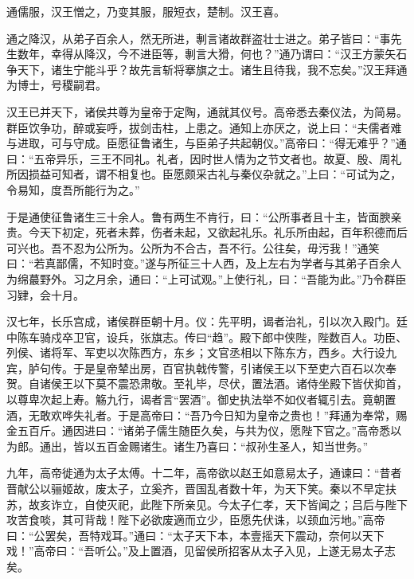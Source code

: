\documentclass[12pt,UTF8]{ctexbook}
\begin{document}
通儒服，汉王憎之，乃变其服，服短衣，楚制。汉王喜。



通之降汉，从弟子百余人，然无所进，剸言诸故群盗壮士进之。弟子皆曰：“事先生数年，幸得从降汉，今不进臣等，剸言大猾，何也？”通乃谓曰：“汉王方蒙矢石争天下，诸生宁能斗乎？故先言斩将搴旗之士。诸生且待我，我不忘矣。”汉王拜通为博士，号稷嗣君。



汉王已并天下，诸侯共尊为皇帝于定陶，通就其仪号。高帝悉去秦仪法，为简易。群臣饮争功，醉或妄呼，拔剑击柱，上患之。通知上亦厌之，说上曰：“夫儒者难与进取，可与守成。臣愿征鲁诸生，与臣弟子共起朝仪。”高帝曰：“得无难乎？”通曰：“五帝异乐，三王不同礼。礼者，因时世人情为之节文者也。故夏、殷、周礼所因损益可知者，谓不相复也。臣愿颇采古礼与秦仪杂就之。”上曰：“可试为之，令易知，度吾所能行为之。”



于是通使征鲁诸生三十余人。鲁有两生不肯行，曰：“公所事者且十主，皆面腴亲贵。今天下初定，死者未葬，伤者未起，又欲起礼乐。礼乐所由起，百年积德而后可兴也。吾不忍为公所为。公所为不合古，吾不行。公往矣，毋污我！”通笑曰：“若真鄙儒，不知时变。”遂与所征三十人西，及上左右为学者与其弟子百余人为绵蕞野外。习之月余，通曰：“上可试观。”上使行礼，曰：“吾能为此。”乃令群臣习肄，会十月。



汉七年，长乐宫成，诸侯群臣朝十月。仪：先平明，谒者治礼，引以次入殿门。廷中陈车骑戍卒卫官，设兵，张旗志。传曰“趋”。殿下郎中侠陛，陛数百人。功臣、列侯、诸将军、军吏以次陈西方，东乡；文官丞相以下陈东方，西乡。大行设九宾，胪句传。于是皇帝辇出房，百官执戟传警，引诸侯王以下至吏六百石以次奉贺。自诸侯王以下莫不震恐肃敬。至礼毕，尽伏，置法酒。诸侍坐殿下皆伏抑首，以尊卑次起上寿。觞九行，谒者言“罢酒”。御史执法举不如仪者辄引去。竟朝置酒，无敢欢哗失礼者。于是高帝曰：“吾乃今日知为皇帝之贵也！”拜通为奉常，赐金五百斤。通因进曰：“诸弟子儒生随臣久矣，与共为仪，愿陛下官之。”高帝悉以为郎。通出，皆以五百金赐诸生。诸生乃喜曰：“叔孙生圣人，知当世务。”



九年，高帝徙通为太子太傅。十二年，高帝欲以赵王如意易太子，通谏曰：“昔者晋献公以骊姬故，废太子，立奚齐，晋国乱者数十年，为天下笑。秦以不早定扶苏，故亥诈立，自使灭祀，此陛下所亲见。今太子仁孝，天下皆闻之；吕后与陛下攻苦食啖，其可背哉！陛下必欲废適而立少，臣愿先伏诛，以颈血污地。”高帝曰：“公罢矣，吾特戏耳。”通曰：“太子天下本，本壹摇天下震动，奈何以天下戏！”高帝曰：“吾听公。”及上置酒，见留侯所招客从太子入见，上遂无易太子志矣。
\end{document}
